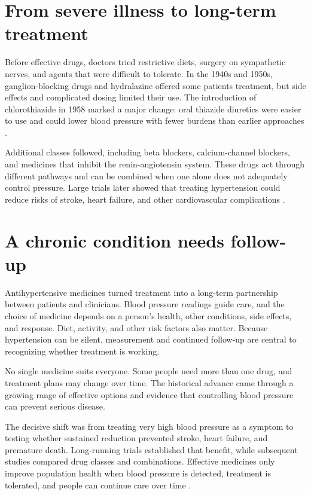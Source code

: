 \documentclass[12pt,oneside]{book}
\begin{document}
\section{From severe illness to long-term treatment}
Before effective drugs, doctors tried restrictive diets, surgery on
sympathetic nerves, and agents that were difficult to tolerate. In the
1940s and 1950s, ganglion-blocking drugs and hydralazine offered some
patients treatment, but side effects and complicated dosing limited their
use. The introduction of chlorothiazide in 1958 marked a major change:
oral thiazide diuretics were easier to use and could lower blood pressure
with fewer burdens than earlier approaches \cite{hypertensionHistory}.

Additional classes followed, including beta blockers, calcium-channel
blockers, and medicines that inhibit the renin-angiotensin system. These
drugs act through different pathways and can be combined when one alone
does not adequately control pressure. Large trials later showed that
treating hypertension could reduce risks of stroke, heart failure, and
other cardiovascular complications \cite{ahaHypertensionMilestones,hypertensionHistory}.

\section{A chronic condition needs follow-up}
Antihypertensive medicines turned treatment into a long-term partnership
between patients and clinicians. Blood pressure readings guide care, and
the choice of medicine depends on a person's health, other conditions,
side effects, and response. Diet, activity, and other risk factors also
matter. Because hypertension can be silent, measurement and continued
follow-up are central to recognizing whether treatment is working.

No single medicine suits everyone. Some people need more than one drug,
and treatment plans may change over time. The historical advance came
through a growing range of effective options and evidence that controlling
blood pressure can prevent serious disease.

The decisive shift was from treating very high blood pressure as a symptom to
testing whether sustained reduction prevented stroke, heart failure, and
premature death. Long-running trials established that benefit, while
subsequent studies compared drug classes and combinations. Effective medicines
only improve population health when blood pressure is detected, treatment is
tolerated, and people can continue care over time
\cite{hypertensionHistory,ahaHypertensionMilestones}.
\end{document}
